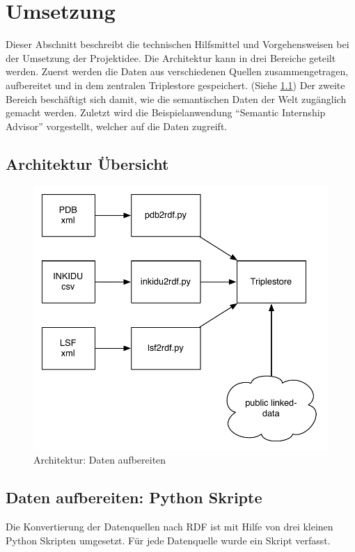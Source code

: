 %
%
\chapter{Umsetzung}
\label{cap-umsetzung}
Dieser Abschnitt beschreibt die technischen Hilfsmittel und Vorgehensweisen bei der Umsetzung der Projektidee.
Die Architektur kann in drei Bereiche geteilt werden.
Zuerst werden die Daten aus verschiedenen Quellen zusammengetragen, aufbereitet und in dem zentralen Triplestore gespeichert. (Siehe \ref{design-step11})
Der zweite Bereich beschäftigt sich damit, wie die semantischen Daten der Welt zugänglich gemacht werden.
Zuletzt wird die Beispielanwendung ``Semantic Internship Advisor'' vorgestellt, welcher auf die Daten zugreift.
\section{Architektur Übersicht}

\begin{figure}[h]
	\centering
	\includegraphics[scale=0.6,]{images/step1_1.pdf}
	\caption{Architektur: Daten aufbereiten}
	\label{design-step11}
\end{figure}

\section{Daten aufbereiten: Python Skripte} %
\label{sec-daten-python}
Die Konvertierung der Datenquellen nach RDF ist mit Hilfe von drei kleinen Python Skripten umgesetzt.
Für jede Datenquelle wurde ein Skript verfasst.


